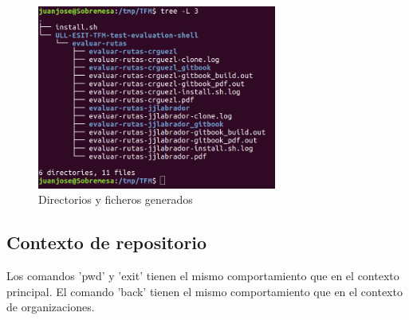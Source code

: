 \begin{itemize}
		\begin{figure}[H]
		\begin{center}
		\includegraphics[width=0.7\textwidth]{images/assignments1-4}
		\caption{Directorios y ficheros generados}
		\label{fig:assignment1-4}
		\end{center}
		\end{figure}		
	
\end{itemize}

\subsection{Contexto de repositorio}
\label{subsec:b.2.3}

	Los comandos 'pwd' y 'exit' tienen el mismo comportamiento que en el contexto principal. 
	El comando 'back' tienen el mismo comportamiento que en el contexto de organizaciones.
	
